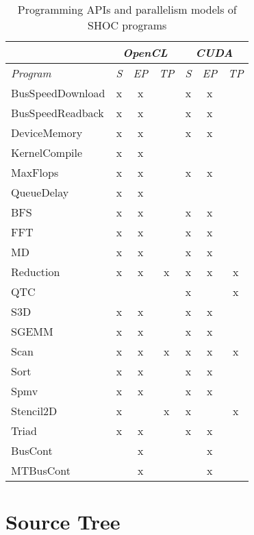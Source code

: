 \documentclass[11pt]{article}
\begin{document}
\begin{table}
\centering
\begin{tabular}{|l|c|c|c|c|c|c|}
\hline
 & \multicolumn{3}{c|}{\em OpenCL} & \multicolumn{3}{c|}{\em CUDA} \\
\hline
{\em Program} & {\em S} & {\em EP} & {\em TP} & {\em S} & {\em EP} & {\em TP} \\
\hline\hline
BusSpeedDownload    & x & x &   & x & x &   \\
BusSpeedReadback    & x & x &   & x & x &   \\
DeviceMemory        & x & x &   & x & x &   \\
KernelCompile       & x & x &   &   &   &   \\
MaxFlops            & x & x &   & x & x &   \\
QueueDelay          & x & x &   &   &   &   \\
BFS                 & x & x &   & x & x &   \\
FFT                 & x & x &   & x & x &   \\
MD                  & x & x &   & x & x &   \\
Reduction           & x & x & x & x & x & x \\
QTC                 &   &   &   & x &   & x \\
S3D                 & x & x &   & x & x &   \\
SGEMM               & x & x &   & x & x &   \\
Scan                & x & x & x & x & x & x \\
Sort                & x & x &   & x & x &   \\
Spmv                & x & x &   & x & x &   \\
Stencil2D           & x &   & x & x &   & x \\
Triad               & x & x &   & x & x &   \\
BusCont             &   & x &   &   & x &   \\
MTBusCont           &   & x &   &   & x &   \\
\hline
\end{tabular}
\caption{Programming APIs and parallelism models of SHOC programs}
\end{table}

\section{Source Tree}\label{sec:source}
\end{document}
